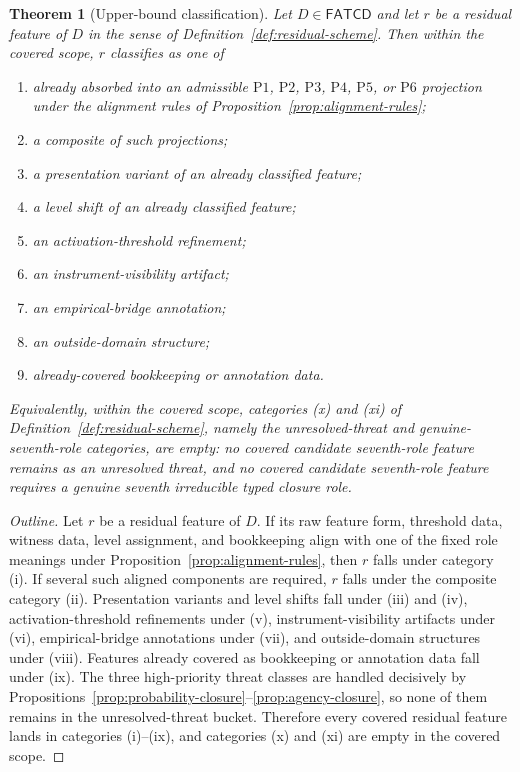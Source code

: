 \documentclass[11pt]{article}
\newtheorem{theorem}{Theorem}[section]
\theoremstyle{definition}
\newcommand{\FATCD}{\ensuremath{\mathsf{FATCD}}}
\newcommand{\Pone}{\ensuremath{\mathrm{P1}}}
\newcommand{\Ptwo}{\ensuremath{\mathrm{P2}}}
\newcommand{\Pthree}{\ensuremath{\mathrm{P3}}}
\newcommand{\Pfour}{\ensuremath{\mathrm{P4}}}
\newcommand{\Pfive}{\ensuremath{\mathrm{P5}}}
\newcommand{\Psix}{\ensuremath{\mathrm{P6}}}
\begin{document}
\begin{theorem}[Upper-bound classification]\label{thm:upper-bound-classification}
Let \(D \in \FATCD{}\) and let \(r\) be a residual feature of \(D\) in the
sense of Definition~\ref{def:residual-scheme}. Then within the covered
scope, \(r\) classifies as one of
\begin{enumerate}[label=(\roman*),topsep=2pt,itemsep=1pt]
  \item already absorbed into an admissible \Pone{}, \Ptwo{}, \Pthree{},
    \Pfour{}, \Pfive{}, or \Psix{} projection under the alignment rules of
    Proposition~\ref{prop:alignment-rules};
  \item a composite of such projections;
  \item a presentation variant of an already classified feature;
  \item a level shift of an already classified feature;
  \item an activation-threshold refinement;
  \item an instrument-visibility artifact;
  \item an empirical-bridge annotation;
  \item an outside-domain structure;
  \item already-covered bookkeeping or annotation data.
\end{enumerate}
Equivalently, within the covered scope, categories (x) and (xi) of
Definition~\ref{def:residual-scheme}, namely the unresolved-threat and
genuine-seventh-role categories, are empty: no covered candidate
seventh-role feature remains as an unresolved threat, and no covered
candidate seventh-role feature requires a genuine seventh irreducible
typed closure role.
\end{theorem}

\begin{proof}[Outline]
Let \(r\) be a residual feature of \(D\). If its raw feature form,
threshold data, witness data, level assignment, and bookkeeping align
with one of the fixed role meanings under
Proposition~\ref{prop:alignment-rules}, then \(r\) falls under category
(i). If several such aligned components are required, \(r\) falls under
the composite category (ii). Presentation variants and level shifts fall
under (iii) and (iv), activation-threshold refinements under (v),
instrument-visibility artifacts under (vi), empirical-bridge annotations
under (vii), and outside-domain structures under (viii). Features already
covered as bookkeeping or annotation data fall under (ix). The three
high-priority threat classes are handled decisively by
Propositions~\ref{prop:probability-closure}--\ref{prop:agency-closure},
so none of them remains in the unresolved-threat bucket. Therefore every
covered residual feature lands in categories (i)--(ix), and categories
(x) and (xi) are empty in the covered scope.
\end{proof}
\end{document}
